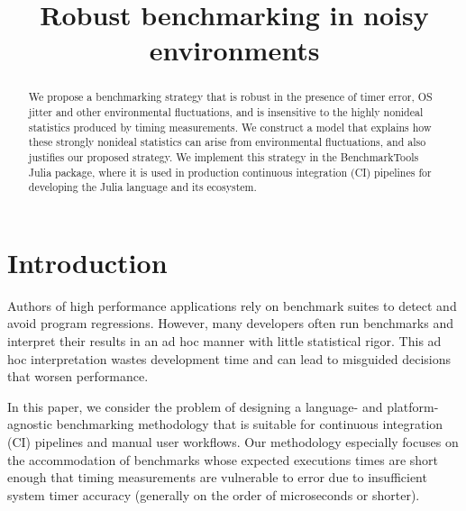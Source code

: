 \documentclass[conference]{IEEEtran}
\begin{document}
\title{Robust benchmarking in noisy environments}

\author{
}

\maketitle

\begin{abstract}
We propose a benchmarking strategy that is robust in the presence of timer
error, OS jitter and other environmental fluctuations, and is insensitive to
the highly nonideal statistics produced by timing measurements.
We construct a model that explains how these strongly nonideal statistics can
arise from environmental fluctuations, and also justifies our proposed
strategy. We implement this strategy in the BenchmarkTools Julia package, where
it is used in production continuous integration (CI) pipelines for developing
the Julia language and its ecosystem.
\end{abstract}

\IEEEpeerreviewmaketitle

\section{Introduction}
\label{sec:intro}

Authors of high performance applications rely on benchmark suites to detect and avoid
program regressions. However, many developers often run benchmarks and interpret their
results in an ad hoc manner with little statistical rigor. This ad hoc interpretation wastes
development time and can lead to misguided decisions that worsen performance.

In this paper, we consider the problem of designing a language- and
platform-agnostic benchmarking methodology that is suitable for continuous
integration (CI) pipelines and manual user workflows. Our methodology
especially focuses on the accommodation of benchmarks whose expected executions
times are short enough that timing measurements are vulnerable to error due to
insufficient system timer accuracy (generally on the order of microseconds or
shorter).
\end{document}
